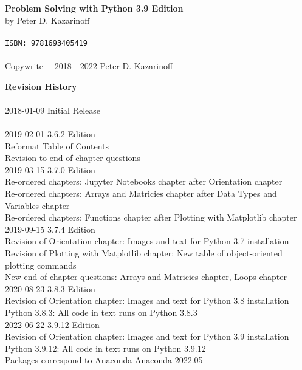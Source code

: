 
\textbf{Problem Solving with Python 3.9 Edition} \\
by Peter D. Kazarinoff \\
\\
\texttt{ISBN: 9781693405419} \\
\\
Copywrite \  \textcopyright \  2018 - 2022 Peter D. Kazarinoff\\

\vspace{2in}

\textbf{Revision History}\\
\\
2018-01-09 Initial Release\\
\\
2019-02-01 3.6.2 Edition\\
Reformat Table of Contents\\
Revision to end of chapter questions\\

2019-03-15 3.7.0 Edition \\
Re-ordered chapters: Jupyter Notebooks chapter after Orientation chapter \\
Re-ordered chapters: Arrays and Matricies chapter after Data Types and Variables chapter \\
Re-ordered chapters: Functions chapter after Plotting with Matplotlib chapter \\

2019-09-15 3.7.4 Edition \\
Revision of Orientation chapter: Images and text for Python 3.7 installation \\
Revision of Plotting with Matplotlib chapter: New table of object-oriented plotting commands \\
New end of chapter questions: Arrays and Matricies chapter, Loops chapter \\

2020-08-23 3.8.3 Edition \\
Revision of Orientation chapter: Images and text for Python 3.8 installation \\
Python 3.8.3: All code in text runs on Python 3.8.3 \\

2022-06-22 3.9.12 Edition \\
Revision of Orientation chapter: Images and text for Python 3.9 installation \\
Python 3.9.12: All code in text runs on Python 3.9.12 \\
Packages correspond to Anaconda Anaconda 2022.05 \\
